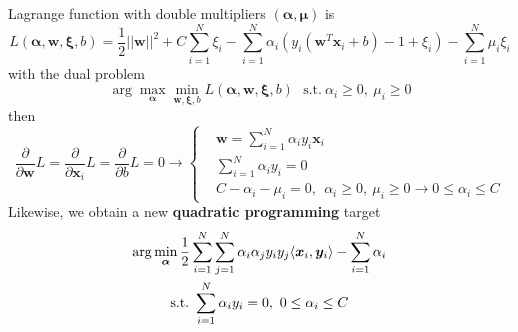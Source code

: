 \documentclass[12pt]{article}
\begin{document}
Lagrange function with double multipliers $(\bm{\alpha}, \bm{\mu})$ is
\begin{equation}
    L(\bm{\alpha}, \bm{w}, \bm{\xi}, b) = \frac{1}{2}||\bm{w}||^2 + C\sum_{i=1}^N \xi_i - \sum_{i=1}^N \alpha_i \left( y_i(\bm{w}^T\bm{x}_i + b) - 1 + \xi_i \right) - \sum_{i=1}^N \mu_i \xi_i
\end{equation}
with the dual problem
\begin{equation}
    \arg \max_{\bm{\alpha}} \min_{\bm{w},\bm{\xi},b}L(\bm{\alpha}, \bm{w}, \bm{\xi}, b)~~~\text{s.t.}~\alpha_i \geq0,~\mu_i \geq 0
\end{equation}
then
\begin{equation}
    \frac{\partial}{\partial \bm{w}} L = \frac{\partial}{\partial \bm{x}_i} L = \frac{\partial}{\partial b} L = 0 \longrightarrow
\left\{ \begin{aligned}
    &\bm{w} = \sum_{i=1}^N \alpha_i y_i \bm{x}_i \\
    &\sum_{i=1}^N \alpha_i y_i = 0\\
    &C - \alpha_i - \mu_i = 0,~~\alpha_i \geq 0,~\mu_i \geq 0 \rightarrow 0 \leq \alpha_i \leq C
\end{aligned}
\right.
\end{equation}
Likewise, we obtain a new \textbf{quadratic programming} target
\begin{gather}
    \arg \min_{\bm{\alpha}} \frac{1}{2}\sum_{i=1}^N \sum_{j=1}^N \alpha_i \alpha_j y_i y_j \langle \bm{x}_i, \bm{y}_i \rangle - \sum_{i=1}^N \alpha_i  \notag \\ \text{s.t.}~\sum_{i=1}^N \alpha_i y_i = 0,~0 \leq \alpha_i \leq C
\end{gather}
\end{document}
